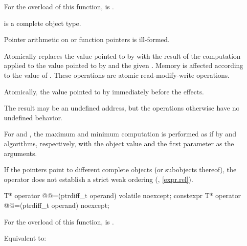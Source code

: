 \begin{itemdescr}
\pnum
\constraints
For the  overload of this function,
 is .

\pnum
\mandates
{} is a complete object type.
\begin{note}
Pointer arithmetic on  or function pointers is ill-formed.
\end{note}

\pnum
\effects
Atomically replaces the value pointed to by
 with the result of the computation applied to the
value pointed to by  and the given .
Memory is affected according to the value of .
These operations are atomic read-modify-write operations.

\pnum
\returns
Atomically, the value pointed to by  immediately before the effects.

\pnum
\remarks
The result may be an undefined address,
but the operations otherwise have no undefined behavior.

\pnum
For  and , the maximum and minimum
computation is performed as if by  and 
algorithms, respectively, with the object value and the first
parameter as the arguments.

\begin{note}
If the pointers point to different complete objects (or subobjects thereof),
the \tcode{<} operator does not establish a strict weak ordering
(, \ref{expr.rel}).
\end{note}
\end{itemdescr}

%
%
\begin{itemdecl}
T* operator @@=(ptrdiff_t operand) volatile noexcept;
constexpr T* operator @@=(ptrdiff_t operand) noexcept;
\end{itemdecl}

\begin{itemdescr}
\pnum
\constraints
For the  overload of this function,
 is .

\pnum
\effects
Equivalent to: 
\end{itemdescr}

